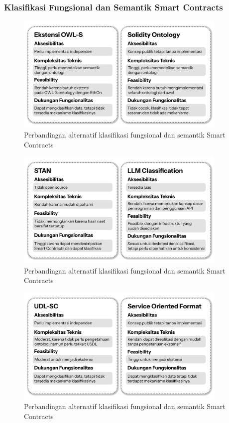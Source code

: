 \subsubsection{Klasifikasi Fungsional dan Semantik Smart Contracts}

\begin{figure}[ht]
	\centering
	\includegraphics[width=0.9\textwidth]{resources/chapter-3/klasifikasi - 1.png}
	\caption{Perbandingan alternatif klasifikasi fungsional dan semantik Smart Contracts}
	\label{image:klasifikasi-1}
\end{figure}

\begin{figure}[ht]
	\centering
	\includegraphics[width=0.9\textwidth]{resources/chapter-3/klasifikasi - 2.png}
	\caption{Perbandingan alternatif klasifikasi fungsional dan semantik Smart Contracts}
	\label{image:klasifikasi-2}
\end{figure}

\begin{figure}[ht]
	\centering
	\includegraphics[width=0.9\textwidth]{resources/chapter-3/klasifikasi - 3.png}
	\caption{Perbandingan alternatif klasifikasi fungsional dan semantik Smart Contracts}
	\label{image:klasifikasi-3}
\end{figure}

